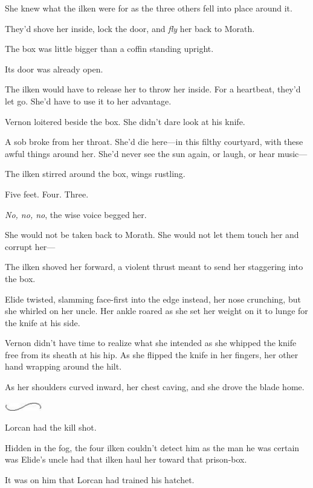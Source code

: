 She knew what the ilken were for as the three others fell into place around it.

They'd shove her inside, lock the door, and \emph{fly} her back to Morath.

The box was little bigger than a coffin standing upright.

Its door was already open.

The ilken would have to release her to throw her inside.
For a heartbeat, they'd let go.
She'd have to use it to her advantage.

Vernon loitered beside the box.
She didn't dare look at his knife.

A sob broke from her throat.
She'd die here---in this filthy courtyard, with these awful things around her.
She'd never see the sun again, or laugh, or hear music---

The ilken stirred around the box, wings rustling.

Five feet.
Four.
Three.

\emph{No, no, no}, the wise voice begged her.

She would not be taken back to Morath.
She would not let them touch her and corrupt her---

The ilken shoved her forward, a violent thrust meant to send her staggering into the box.

Elide twisted, slamming face-first into the edge instead, her nose crunching, but she whirled on her uncle.
Her ankle roared as she set her weight on it to lunge for the knife at his side.

Vernon didn't have time to realize what she intended as she whipped the knife free from its sheath at his hip.
As she flipped the knife in her fingers, her other hand wrapping around the hilt.

As her shoulders curved inward, her chest caving, and she drove the blade home.

\begin{center}
	\includegraphics[width=0.65in,height=0.13in]{images/seperator}
\end{center}

Lorcan had the kill shot.

Hidden in the fog, the four ilken couldn't detect him as the man he was certain was Elide's uncle had that ilken haul her toward that prison-box.

It was on him that Lorcan had trained his hatchet.

